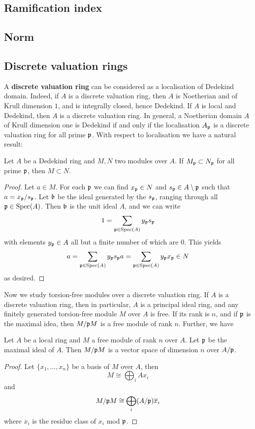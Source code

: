 		\subsection{Ramification index}
		
		\subsection{Norm}
		
		\subsection{Discrete valuation rings}
			A \textbf{discrete valuation ring} can be considered as a localisation of Dedekind domain. Indeed, if $A$ is a discrete valuation ring, then $A$ is Noetherian and of Krull dimension $1$, and is integrally closed, hence Dedekind. If $A$ is local and Dedekind, then $A$ is a discrete valuation ring. In general, a Noetherian domain $A$ of Krull dimension one is Dedekind if and only if the localisation $A_\mathfrak{p}$ is a discrete valuation ring for all prime $\mathfrak{p}$. With respect to localisation we have a natural result:
			\begin{theorem}
				Let $A$ be a Dedekind ring and $M,N$ two modules over $A$. If $M_\mathfrak{p} \subset N_\mathfrak{p}$ for all prime $\mathfrak{p}$, then $M \subset N$.
			\end{theorem}
			\begin{proof}
				Let $a \in M$. For each $\mathfrak{p}$ we can find $x_\mathfrak{p} \in N$ and $s_\mathfrak{p} \in A \setminus \mathfrak{p}$ such that $a = x_\mathfrak{p}/s_\mathfrak{p}$. Let $\mathfrak{b}$ be the ideal generated by the $s_\mathfrak{p}$, ranging through all $\mathfrak{p} \in \operatorname{Spec}(A)$. Then $\mathfrak{b}$ is the unit ideal $A$, and we can write
				\[
					1 = \sum_{\mathfrak{p} \in \operatorname{Spec}(A)} y_\mathfrak{p}s_\mathfrak{p}
				\]
				with elements $y_\mathfrak{p} \in A$ all but a finite number of which are $0$. This yields
				\[
					a = \sum_{\mathfrak{p} \in \operatorname{Spec}(A)} y_\mathfrak{p}s_\mathfrak{p}a = \sum_{\mathfrak{p} \in \operatorname{Spec}(A)} y_\mathfrak{p}x_\mathfrak{p} \in N
				\]
				as desired.
			\end{proof}
		
			Now we study torsion-free modules over a discrete valuation ring. If $A$ is a discrete valuation ring, then in particular, $A$ is a principal ideal ring, and any finitely generated torsion-free module $M$ over $A$ is free. If its rank is $n$, and if $\mathfrak{p}$ is the maximal idea, then $M/\mathfrak{p}M$ is a free module of rank $n$. Further, we have
			\begin{theorem}
				Let $A$ be a local ring and $M$ a free module of rank $n$ over $A$. Let $\mathfrak{p}$ be the maximal ideal of $A$. Then $M/\mathfrak{p}M$ is a vector space of dimension $n$ over $A/\mathfrak{p}$.
			\end{theorem}
			\begin{proof}
				Let $\{x_1,\dots,x_n\}$ be a basis of $M$ over $A$, then
				\[
					M \cong \bigoplus_{i}Ax_i
				\]
				and
				\[
					M/\mathfrak{p}M \cong \bigoplus_{i}(A/\mathfrak{p})\overline{x}_i
				\]
				where $\overline{x}_i$ is the residue class of $x_i$ mod $\mathfrak{p}$.
			\end{proof}
